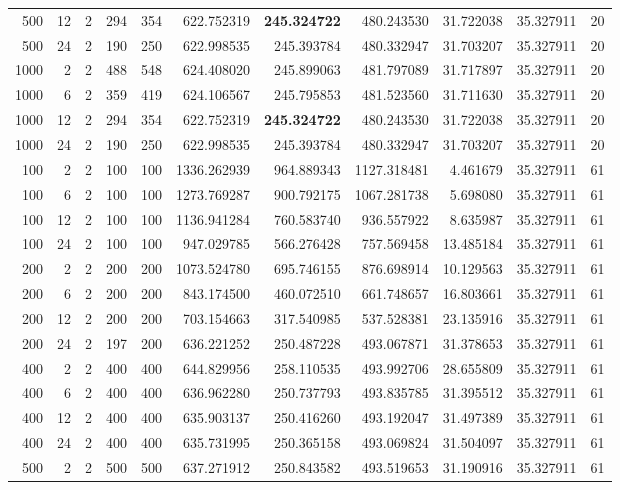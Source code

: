 \begin{table}
\begin{tabular}{rrrrrrrrrrr}
500 & 12 & 2 & 294 & 354 & 622.752319 & \textbf{245.324722} & 480.243530 & 31.722038 & 35.327911 & 20 \\
500 & 24 & 2 & 190 & 250 & 622.998535 & 245.393784 & 480.332947 & 31.703207 & 35.327911 & 20 \\
1000 & 2 & 2 & 488 & 548 & 624.408020 & 245.899063 & 481.797089 & 31.717897 & 35.327911 & 20 \\
1000 & 6 & 2 & 359 & 419 & 624.106567 & 245.795853 & 481.523560 & 31.711630 & 35.327911 & 20 \\
1000 & 12 & 2 & 294 & 354 & 622.752319 & \textbf{245.324722} & 480.243530 & 31.722038 & 35.327911 & 20 \\
1000 & 24 & 2 & 190 & 250 & 622.998535 & 245.393784 & 480.332947 & 31.703207 & 35.327911 & 20 \\
100 & 2 & 2 & 100 & 100 & 1336.262939 & 964.889343 & 1127.318481 & 4.461679 & 35.327911 & 61 \\
100 & 6 & 2 & 100 & 100 & 1273.769287 & 900.792175 & 1067.281738 & 5.698080 & 35.327911 & 61 \\
100 & 12 & 2 & 100 & 100 & 1136.941284 & 760.583740 & 936.557922 & 8.635987 & 35.327911 & 61 \\
100 & 24 & 2 & 100 & 100 & 947.029785 & 566.276428 & 757.569458 & 13.485184 & 35.327911 & 61 \\
200 & 2 & 2 & 200 & 200 & 1073.524780 & 695.746155 & 876.698914 & 10.129563 & 35.327911 & 61 \\
200 & 6 & 2 & 200 & 200 & 843.174500 & 460.072510 & 661.748657 & 16.803661 & 35.327911 & 61 \\
200 & 12 & 2 & 200 & 200 & 703.154663 & 317.540985 & 537.528381 & 23.135916 & 35.327911 & 61 \\
200 & 24 & 2 & 197 & 200 & 636.221252 & 250.487228 & 493.067871 & 31.378653 & 35.327911 & 61 \\
400 & 2 & 2 & 400 & 400 & 644.829956 & 258.110535 & 493.992706 & 28.655809 & 35.327911 & 61 \\
400 & 6 & 2 & 400 & 400 & 636.962280 & 250.737793 & 493.835785 & 31.395512 & 35.327911 & 61 \\
400 & 12 & 2 & 400 & 400 & 635.903137 & 250.416260 & 493.192047 & 31.497389 & 35.327911 & 61 \\
400 & 24 & 2 & 400 & 400 & 635.731995 & 250.365158 & 493.069824 & 31.504097 & 35.327911 & 61 \\
500 & 2 & 2 & 500 & 500 & 637.271912 & 250.843582 & 493.519653 & 31.190916 & 35.327911 & 61 \\

\end{tabular}
\end{table}
